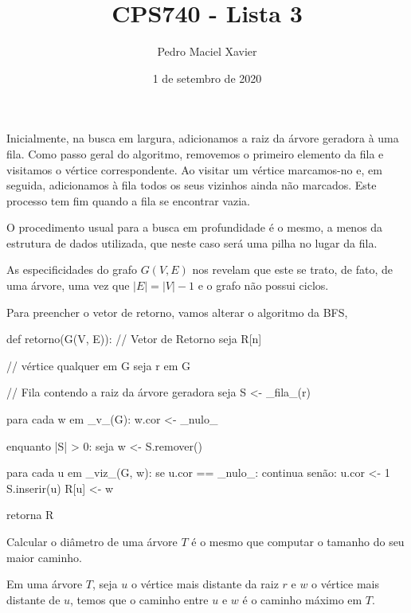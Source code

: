 \documentclass{homework}
\title{CPS740 - Lista 3}
\author{Pedro Maciel Xavier}
\date{1 de setembro de 2020}
\begin{document}
	
	\maketitle
	
	\quest %
	
	\subsubquest Inicialmente, na busca em largura, adicionamos a raiz da árvore geradora à uma fila. Como passo geral do algoritmo, removemos o primeiro elemento da fila e visitamos o vértice correspondente. Ao visitar um vértice marcamos-no e, em seguida, adicionamos à fila todos os seus vizinhos ainda não marcados. Este processo tem fim quando a fila se encontrar vazia.
	\begin{fig}
		
	\end{fig}

	\subsubquest O procedimento usual para a busca em profundidade é o mesmo, a menos da estrutura de dados utilizada, que neste caso será uma pilha no lugar da fila.
	\begin{fig}
		
	\end{fig}

	\quest %
	
	As especificidades do grafo $G(V, E)$ nos revelam que este se trato, de fato, de uma árvore, uma vez que $|E| = |V| - 1$ e o grafo não possui ciclos.
	
	\subsubquest Para preencher o vetor de retorno, vamos alterar o algoritmo da BFS,
	
	\begin{algor}
	def retorno(G(V, E)):
		// Vetor de Retorno
		seja R[n]
		
		// vértice qualquer em G
		seja r em G 
		
		// Fila contendo a raiz da árvore geradora
		seja S <- _fila_({r})
		
		para cada w em _v_(G):
			w.cor <- _nulo_
		
		enquanto |S| > 0:
			seja w <- S.remover()

			para cada u em _viz_(G, w):
				se u.cor == _nulo_:
					continua
				senão:
					u.cor <- 1
					S.inserir(u)
					R[u] <- w

		retorna R
	\end{algor}

	\subsubquest Calcular o diâmetro de uma árvore $T$ é o mesmo que computar o tamanho do seu maior caminho.
	
	\begin{supposition}
		Em uma árvore $T$, seja $u$ o vértice mais distante da raiz $r$ e $w$ o vértice mais distante de $u$, temos que o caminho entre $u$ e $w$ é o caminho máximo em $T$.
	\end{supposition}
\end{document}
